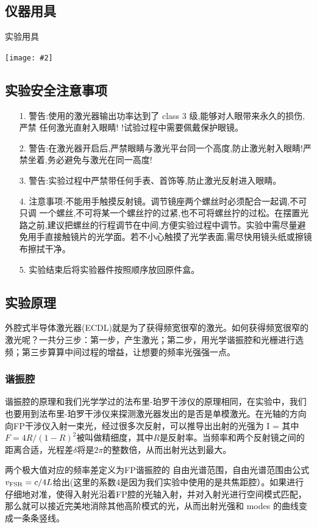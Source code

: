 \documentclass[10pt,a4paper]{ctexart}
\newcommand{\cpic}[2]{
\begin{center}
\texttt{[image: \#2]}
\end{center}
}
\begin{document}
\subsection{仪器用具}
\begin{table}[H]
  \caption{实验用具}
\cpic{0.4}{t1}
\end{table}

\subsection{实验安全注意事项}
\begin{enumerate}
\item[1.] 警告:使用的激光器输出功率达到了 class 3 级,能够对人眼带来永久的损伤,严禁
任何激光直射入眼睛!
!试验过程中需要佩戴保护眼镜。
\item[2.] 警告:在激光器开启后,严禁眼睛与激光平台同一个高度,防止激光射入眼睛!严
禁坐着,务必避免与激光在同一高度!
\item[3.] 警告:实验过程中严禁带任何手表、首饰等,防止激光反射进入眼睛。
\item[4.] 注意事项:不能用手触摸反射镜。调节镜座两个螺丝时必须配合一起调,不可只调
一个螺丝,不可将某一个螺丝拧的过紧,也不可将螺丝拧的过松。在摆置光路之前,建议把螺丝的行程调节在中间,方便实验过程中调节。实验中需尽量避免用手直接触镜片的光学面。若不小心触摸了光学表面,需尽快用镜头纸或擦镜布擦拭干净。
\item[5.]实验结束后将实验器件按照顺序放回原件盒。
\end{enumerate}
\subsection{实验原理}
外腔式半导体激光器(ECDL)就是为了获得频宽很窄的激光。如何获得频宽很窄的激光呢？一共分三步：第一步，产生激光；第二步，用光学谐振腔和光栅进行选频；第三步算算中间过程的增益，让想要的频率光强强一点。
\subsubsection{谐振腔}
谐振腔的原理和我们光学学过的法布里-珀罗干涉仪的原理相同，在实验中，我们也要用到法布里-珀罗干涉仪来探测激光器发出的是否是单模激光。在光轴的方向向FP干涉仪入射一束光，经过很多次反射，可以推导出出射的光强为
\beq
I = 
\eeq
其中$F = 4R/(1-R)^2$被叫做精细度，其中$R$是反射率。当频率和两个反射镜之间的距离合适，光程差$\delta$将是$2\pi$的整数倍，从而出射光达到最大。

两个极大值对应的频率差定义为FP谐振腔的{\color{red} 自由光谱范围}，自由光谱范围由公式$v_{\rm FSR}=c/4L$给出(这里的系数$4$是因为我们实验中使用的是共焦距腔）。如果进行仔细地对准，使得入射光沿着FP腔的光轴入射，并对入射光进行空间模式匹配，那么就可以接近完美地消除其他高阶模式的光，从而出射光强和 modes 的曲线变成一条条竖线。
\end{document}
